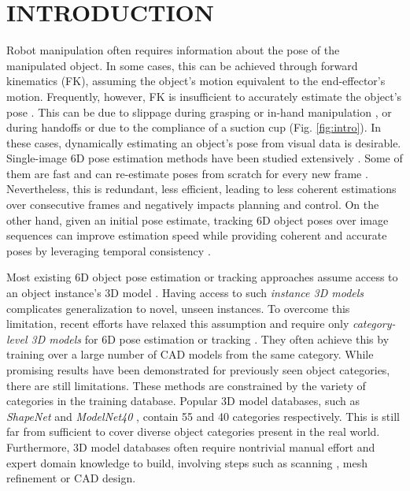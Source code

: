 \documentclass[letterpaper, 10 pt, conference]{ieeeconf}
\begin{document}
\section{INTRODUCTION}
Robot manipulation often requires information about the pose of the manipulated object. In some cases, this can be achieved through forward kinematics (FK), assuming the object's motion equivalent to the end-effector's motion. Frequently, however, FK is insufficient to accurately estimate the object's pose \cite{kappler2018real}. This can be due to slippage during grasping or in-hand manipulation \cite{wen2020robust}, or during handoffs or due to the compliance of a suction cup (Fig. \ref{fig:intro}). In these cases, dynamically estimating an object's pose from visual data is desirable. Single-image 6D pose estimation methods have been studied extensively \cite{xiang2017posecnn, park2019pix2pose, li2019cdpn, he2020pvn3d,mitash2020scene}. Some of them are fast and can re-estimate poses from scratch for every new frame \cite{tremblay2018deep, wang2019densefusion}. Nevertheless, this is redundant, less efficient, leading to less coherent estimations over consecutive frames and negatively impacts planning and control. On the other hand, given an initial pose estimate, tracking 6D object poses over image sequences can improve estimation speed while providing coherent and accurate poses by leveraging temporal consistency \cite{deng2019poserbpf,Wthrich2013ProbabilisticOT, schmidt2014dart}.

Most existing 6D object pose estimation or tracking approaches assume access to an  object instance's 3D model \cite{xiang2017posecnn,wang2019densefusion}. Having access to  such \textit{instance 3D models} complicates generalization to novel, unseen instances. To overcome this limitation, recent efforts have relaxed this assumption and require only \textit{category-level 3D models} for 6D pose estimation \cite{Wang_2019_CVPR,park2020latentfusion,chen2020category,chen2020learning} or tracking \cite{wang20196-pack}. They often achieve this by training over a large number of CAD models from the same category. While promising results have been demonstrated for previously seen object categories, there are still limitations. These methods are constrained by the variety of categories in the training database. Popular 3D model databases, such as \textit{ShapeNet} \cite{chang2015shapenet} and \textit{ModelNet40} \cite{wu20153d}, contain 55 and 40 categories respectively. This is still far from sufficient to cover diverse object categories present in the real world. Furthermore, 3D model databases often require nontrivial manual effort and expert domain knowledge to build, involving steps such as scanning \cite{newcombe2011kinectfusion}, mesh refinement \cite{cignoni2008meshlab} or CAD design.
\end{document}
